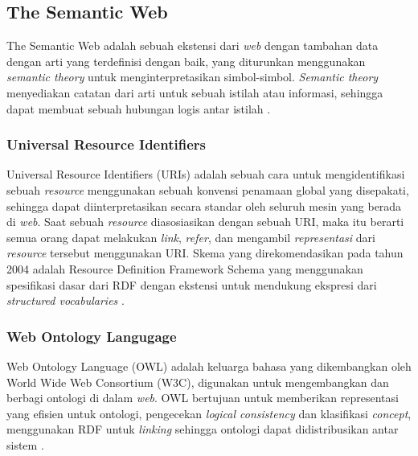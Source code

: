 \subsection{The Semantic Web}
\label{subsec:the-semantic-web}

The Semantic Web adalah sebuah ekstensi dari \textit{web} dengan tambahan data dengan arti yang terdefinisi dengan baik, yang diturunkan menggunakan \textit{semantic theory} untuk menginterpretasikan simbol-simbol. \textit{Semantic theory} menyediakan catatan dari arti untuk sebuah istilah atau informasi, sehingga dapat membuat sebuah hubungan logis antar istilah \parencite{shadbolt2006semantic}.

\subsubsection{Universal Resource Identifiers}
\label{subsubsec:universal-resource-identifiers}

Universal Resource Identifiers (URIs) adalah sebuah cara untuk mengidentifikasi sebuah \textit{resource} menggunakan sebuah konvensi penamaan global yang disepakati, sehingga dapat diinterpretasikan secara standar oleh seluruh mesin yang berada di \textit{web}. Saat sebuah \textit{resource} diasosiasikan dengan sebuah URI, maka itu berarti semua orang dapat melakukan \textit{link}, \textit{refer}, dan mengambil \textit{representasi} dari \textit{resource} tersebut menggunakan URI. Skema yang direkomendasikan pada tahun 2004 adalah Resource Definition Framework Schema yang menggunakan spesifikasi dasar dari RDF dengan ekstensi untuk mendukung ekspresi dari \textit{structured vocabularies} \parencite{shadbolt2006semantic}.

\subsubsection{Web Ontology Langugage}
\label{subsubsec:web-ontology-language}

Web Ontology Language (OWL) adalah keluarga bahasa yang dikembangkan oleh World Wide Web Consortium (W3C), digunakan untuk mengembangkan dan berbagi ontologi di dalam \textit{web}. OWL bertujuan untuk memberikan representasi yang efisien untuk ontologi, pengecekan \textit{logical consistency} dan klasifikasi \textit{concept}, menggunakan RDF untuk \textit{linking} sehingga ontologi dapat didistribusikan antar sistem \parencite{shadbolt2006semantic}.